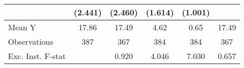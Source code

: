 {\begin{tabular}{l*{5}{c}}
            &     (2.441)         &     (2.460)         &     (1.614)         &     (1.001)         &                     \\
\midrule
Mean Y      &       17.86         &       17.49         &        4.62         &        0.65         &       17.49         \\
Observations&         387         &         367         &         384         &         384         &         367         \\
Exc. Inst. F-stat&                     &       0.920         &       4.046         &       7.030         &       0.657         \\
\bottomrule
\end{tabular}
}
